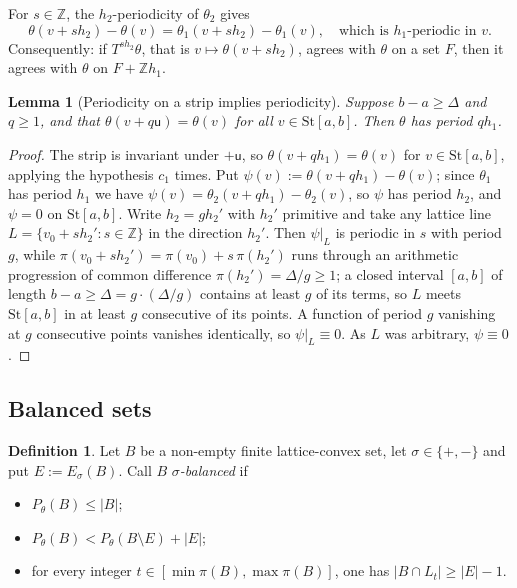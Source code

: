 \documentclass[11pt,reqno]{amsart}
\theoremstyle{plain}
\newtheorem{lem}[thm]{Lemma}
\theoremstyle{definition}
\newtheorem{dfn}[thm]{Definition}
\theoremstyle{remark}
\theoremstyle{plain}
\theoremstyle{remark}
\theoremstyle{definition}
\numberwithin{equation}{section}
\newcommand{\Z}{\mathbb{Z}}
\newcommand{\su}{\mathsf{u}}
\begin{document}
For $s\in\Z$, the $h_2$-periodicity of $\theta_2$ gives
\begin{equation}
\theta(v+sh_2)-\theta(v)=\theta_1(v+sh_2)-\theta_1(v),
\quad\text{which is $h_1$-periodic in $v$.}
\label{eq:D-diff}
\end{equation}
Consequently: if $T^{sh_2}\theta$, that is $v\mapsto\theta(v+sh_2)$, agrees with
$\theta$ on a set $F$, then it agrees with $\theta$ on $F+\Z h_1$.

\begin{lem}[Periodicity on a strip implies periodicity]\label{lem:strip-period}
Suppose $b-a\ge\Delta$ and $q\ge1$, and that $\theta(v+q\su)=\theta(v)$ for all
$v\in\mathrm{St}[a,b]$.  Then $\theta$ has period $qh_1$.
\end{lem}

\begin{proof}
The strip is invariant under $+\su$, so $\theta(v+qh_1)=\theta(v)$ for
$v\in\mathrm{St}[a,b]$, applying the hypothesis $c_1$ times.  Put
$\psi(v):=\theta(v+qh_1)-\theta(v)$; since $\theta_1$ has period $h_1$ we have
$\psi(v)=\theta_2(v+qh_1)-\theta_2(v)$, so $\psi$ has period $h_2$, and
$\psi=0$ on $\mathrm{St}[a,b]$.  Write $h_2=gh_2'$ with $h_2'$ primitive and
take any lattice line $L=\{v_0+sh_2':s\in\Z\}$ in the direction $h_2'$.  Then
$\psi|_L$ is periodic in $s$ with period $g$, while
$\pi(v_0+sh_2')=\pi(v_0)+s\,\pi(h_2')$ runs through an arithmetic progression of
common difference $\pi(h_2')=\Delta/g\ge1$; a closed interval $[a,b]$ of length
$b-a\ge\Delta=g\cdot(\Delta/g)$ contains at least $g$ of its terms, so $L$ meets
$\mathrm{St}[a,b]$ in at least $g$ consecutive of its points.  A function of
period $g$ vanishing at $g$ consecutive points vanishes identically, so
$\psi|_L\equiv0$.  As $L$ was arbitrary, $\psi\equiv0$.
\end{proof}

\subsection{Balanced sets}\label{app:szab-balanced}

\begin{dfn}\label{dfn:balanced}
Let $B$ be a non-empty finite lattice-convex set, let $\sigma\in\{+,-\}$ and put
$E:=E_\sigma(B)$.  Call $B$ \emph{$\sigma$-balanced} if
\begin{itemize}
\item[\textup{(i)}] $P_\theta(B)\le|B|$;
\item[\textup{(ii)}] $P_\theta(B)<P_\theta(B\setminus E)+|E|$;
\item[\textup{(iii)}] for every integer
      $t\in[\min\pi(B),\max\pi(B)]$, one has $|B\cap L_t|\ge|E|-1$.
\end{itemize}
\end{dfn}
\end{document}
